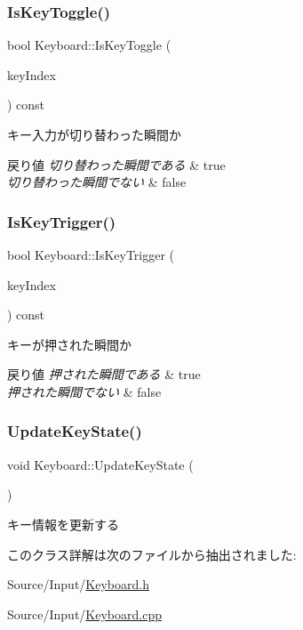 \subsubsection{\texorpdfstring{Is\+Key\+Toggle()}{IsKeyToggle()}}
{\footnotesize\ttfamily bool Keyboard\+::\+Is\+Key\+Toggle (\begin{DoxyParamCaption}\item[{\mbox{\hyperlink{_keyboard_8h_a50f7749e42959062d6f7ee3df6a2fd93}{Virtual\+Key\+Index}}}]{key\+Index }\end{DoxyParamCaption}) const}



キー入力が切り替わった瞬間か 


\begin{DoxyRetVals}{戻り値}
{\em 切り替わった瞬間である} & true \\
\hline
{\em 切り替わった瞬間でない} & false \\
\hline
\end{DoxyRetVals}
\mbox{\label{class_keyboard_ad50dbd6947878292c3b5f22c07b5b613}} 
\subsubsection{\texorpdfstring{Is\+Key\+Trigger()}{IsKeyTrigger()}}
{\footnotesize\ttfamily bool Keyboard\+::\+Is\+Key\+Trigger (\begin{DoxyParamCaption}\item[{\mbox{\hyperlink{_keyboard_8h_a50f7749e42959062d6f7ee3df6a2fd93}{Virtual\+Key\+Index}}}]{key\+Index }\end{DoxyParamCaption}) const}



キーが押された瞬間か 


\begin{DoxyRetVals}{戻り値}
{\em 押された瞬間である} & true \\
\hline
{\em 押された瞬間でない} & false \\
\hline
\end{DoxyRetVals}
\mbox{\label{class_keyboard_a521e2533e12aa4841c8c56c4c3dfccfc}} 
\subsubsection{\texorpdfstring{Update\+Key\+State()}{UpdateKeyState()}}
{\footnotesize\ttfamily void Keyboard\+::\+Update\+Key\+State (\begin{DoxyParamCaption}{ }\end{DoxyParamCaption})}



キー情報を更新する 



このクラス詳解は次のファイルから抽出されました\+:\begin{DoxyCompactItemize}
\item 
Source/\+Input/\mbox{\hyperlink{_keyboard_8h}{Keyboard.\+h}}\item 
Source/\+Input/\mbox{\hyperlink{_keyboard_8cpp}{Keyboard.\+cpp}}\end{DoxyCompactItemize}
